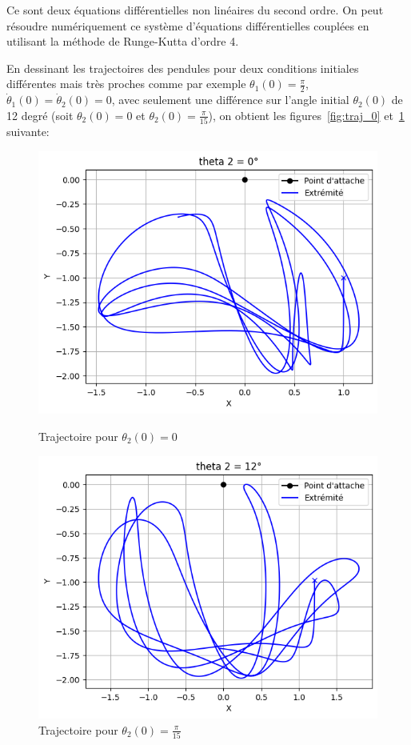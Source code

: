 Ce sont deux équations différentielles non linéaires du second ordre. 
On peut résoudre numériquement ce système d'équations différentielles couplées en utilisant la méthode de Runge-Kutta d'ordre 4.

\bigskip

En dessinant les trajectoires des pendules pour deux conditions initiales différentes mais très proches comme par exemple 
$ \theta_{1}(0) = \frac{\pi}{2} $, $ \dot \theta_{1}(0) = \dot \theta_{2}(0) = 0 $, avec seulement une différence sur l'angle initial $ \theta_{2}(0) $ de 12 degré (soit $ \theta_{2}(0) = 0 $ et $ \theta_{2}(0) = \frac{\pi}{15} $),
on obtient les figures~\ref{fig:traj_0} et~\ref{fig:traj_12} suivante:

\begin{figure} [htbp!]
  \begin{minipage}[c]{0.5\textwidth}
	\centering
	\includegraphics[width=\textwidth]{res/traj_0.png}
	\caption{Trajectoire pour $ \theta_{2}(0) = 0 $}
	  \label{fig:traj_0}
  \end{minipage}\hfill
  \begin{minipage}[c]{0.5\textwidth}
	\centering
	\includegraphics[width=\textwidth]{res/traj_12.png}
	\caption{Trajectoire pour $ \theta_{2}(0) = \frac{\pi}{15} $}
	  \label{fig:traj_12}
  \end{minipage}
\end{figure}

